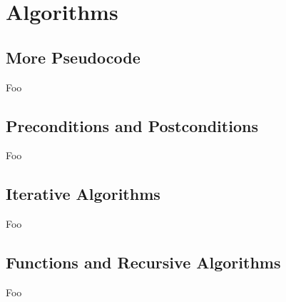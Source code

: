 \section{Algorithms}

\subsection{More Pseudocode}

Foo

\subsection{Preconditions and Postconditions}

Foo

\subsection{Iterative Algorithms}

Foo

\subsection{Functions and Recursive Algorithms}

Foo

